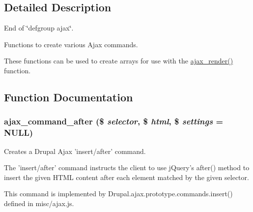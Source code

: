 \subsection{Detailed Description}
End of \char`\"{}defgroup ajax\char`\"{}.

Functions to create various Ajax commands.

These functions can be used to create arrays for use with the \hyperlink{group__ajax_ga241c2426bdde049c55b05b7bf5d714a2}{ajax\_\-render()} function. 

\subsection{Function Documentation}
\hypertarget{group__ajax__commands_ga530d78ba7ea73497567e401a42fbbf94}{
\subsubsection[{ajax\_\-command\_\-after}]{\setlength{\rightskip}{0pt plus 5cm}ajax\_\-command\_\-after (\$ {\em selector}, \/  \$ {\em html}, \/  \$ {\em settings} = {\ttfamily NULL})}}
\label{group__ajax__commands_ga530d78ba7ea73497567e401a42fbbf94}
Creates a Drupal Ajax 'insert/after' command.

The 'insert/after' command instructs the client to use jQuery's after() method to insert the given HTML content after each element matched by the given selector.

This command is implemented by Drupal.ajax.prototype.commands.insert() defined in misc/ajax.js.


